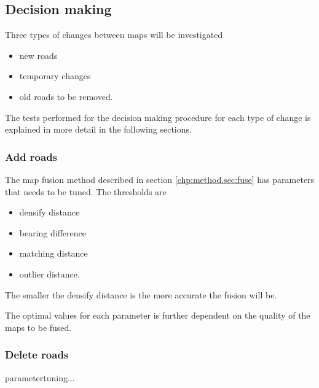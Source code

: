 \subsection{Decision making}
Three types of changes between maps will be investigated

\begin{itemize}
    \item new roads
    \item temporary changes
    \item old roads to be removed.
\end{itemize}

The tests performed for the decision making procedure for each type of change is explained in more detail in the following sections.

\subsubsection{Add roads}
\label{chp:experiments.sec:mapfuse.sub:dec.sub:add}
The map fusion method described in section \ref{chp:method.sec:fuse} has parameters that needs to be tuned. The thresholds are
\begin{itemize}
    \item densify distance
    \item bearing difference
    \item matching distance
    \item outlier distance.
\end{itemize}
The smaller the densify distance is the more accurate the fusion will be.   

The optimal values for each parameter is further dependent on the quality of the maps to be fused. 

\subsubsection{Delete roads}



parametertuning...





